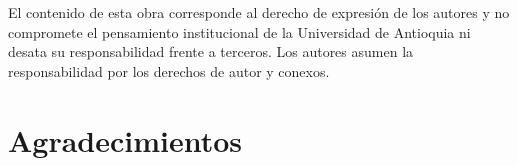 \documentclass[12pt,letterpaper,oneside]{report}
\begin{document}
\noindent El contenido de esta obra corresponde al derecho de expresión de los autores y no compromete el pensamiento institucional de la Universidad de Antioquia ni desata su responsabilidad frente a terceros. Los autores asumen la responsabilidad por los derechos de autor y conexos.





\newpage

\setcounter{page}{3}

\chapter*{Agradecimientos}
\end{document}

